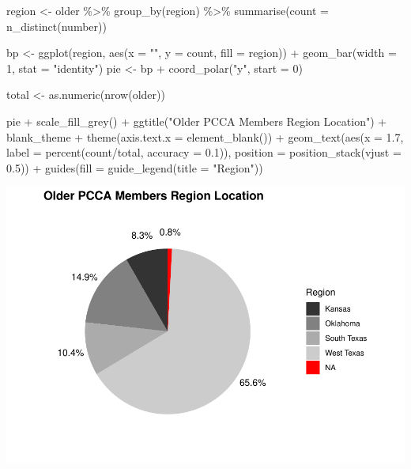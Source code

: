 \documentclass[
]{article}
\newenvironment{Shaded}{\begin{snugshade}}{\end{snugshade}}
\newcommand{\AttributeTok}[1]{\textcolor[rgb]{0.77,0.63,0.00}{#1}}
\newcommand{\DecValTok}[1]{\textcolor[rgb]{0.00,0.00,0.81}{#1}}
\newcommand{\FloatTok}[1]{\textcolor[rgb]{0.00,0.00,0.81}{#1}}
\newcommand{\FunctionTok}[1]{\textcolor[rgb]{0.00,0.00,0.00}{#1}}
\newcommand{\NormalTok}[1]{#1}
\newcommand{\OtherTok}[1]{\textcolor[rgb]{0.56,0.35,0.01}{#1}}
\newcommand{\SpecialCharTok}[1]{\textcolor[rgb]{0.00,0.00,0.00}{#1}}
\newcommand{\StringTok}[1]{\textcolor[rgb]{0.31,0.60,0.02}{#1}}
\begin{document}
\begin{Shaded}
\begin{Highlighting}[]
\NormalTok{region }\OtherTok{\textless{}{-}}\NormalTok{ older }\SpecialCharTok{\%\textgreater{}\%}
    \FunctionTok{group\_by}\NormalTok{(region) }\SpecialCharTok{\%\textgreater{}\%}
    \FunctionTok{summarise}\NormalTok{(}\AttributeTok{count =} \FunctionTok{n\_distinct}\NormalTok{(number))}

\NormalTok{bp }\OtherTok{\textless{}{-}} \FunctionTok{ggplot}\NormalTok{(region, }\FunctionTok{aes}\NormalTok{(}\AttributeTok{x =} \StringTok{""}\NormalTok{, }\AttributeTok{y =}\NormalTok{ count, }\AttributeTok{fill =}\NormalTok{ region)) }\SpecialCharTok{+}
    \FunctionTok{geom\_bar}\NormalTok{(}\AttributeTok{width =} \DecValTok{1}\NormalTok{, }\AttributeTok{stat =} \StringTok{"identity"}\NormalTok{)}
\NormalTok{pie }\OtherTok{\textless{}{-}}\NormalTok{ bp }\SpecialCharTok{+} \FunctionTok{coord\_polar}\NormalTok{(}\StringTok{"y"}\NormalTok{, }\AttributeTok{start =} \DecValTok{0}\NormalTok{)}

\NormalTok{total }\OtherTok{\textless{}{-}} \FunctionTok{as.numeric}\NormalTok{(}\FunctionTok{nrow}\NormalTok{(older))}

\NormalTok{pie }\SpecialCharTok{+} \FunctionTok{scale\_fill\_grey}\NormalTok{() }\SpecialCharTok{+} \FunctionTok{ggtitle}\NormalTok{(}\StringTok{"Older PCCA Members Region Location"}\NormalTok{) }\SpecialCharTok{+}
\NormalTok{    blank\_theme }\SpecialCharTok{+} \FunctionTok{theme}\NormalTok{(}\AttributeTok{axis.text.x =} \FunctionTok{element\_blank}\NormalTok{()) }\SpecialCharTok{+} \FunctionTok{geom\_text}\NormalTok{(}\FunctionTok{aes}\NormalTok{(}\AttributeTok{x =} \FloatTok{1.7}\NormalTok{,}
    \AttributeTok{label =} \FunctionTok{percent}\NormalTok{(count}\SpecialCharTok{/}\NormalTok{total, }\AttributeTok{accuracy =} \FloatTok{0.1}\NormalTok{)), }\AttributeTok{position =} \FunctionTok{position\_stack}\NormalTok{(}\AttributeTok{vjust =} \FloatTok{0.5}\NormalTok{)) }\SpecialCharTok{+}
    \FunctionTok{guides}\NormalTok{(}\AttributeTok{fill =} \FunctionTok{guide\_legend}\NormalTok{(}\AttributeTok{title =} \StringTok{"Region"}\NormalTok{))}
\end{Highlighting}
\end{Shaded}

\includegraphics{pcca_survey_files/figure-latex/region-old-1.pdf}
\end{document}
